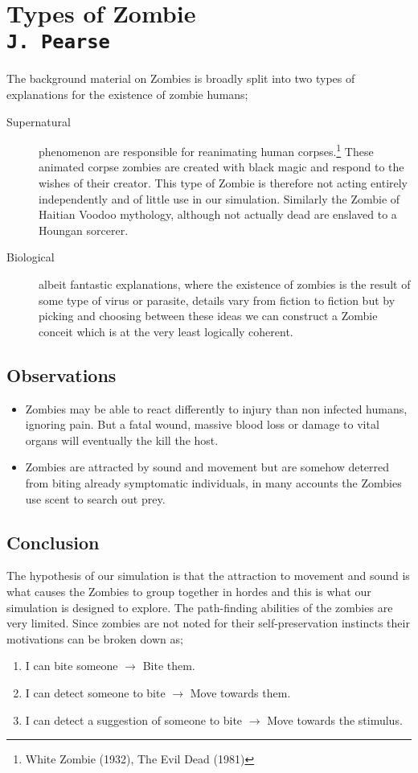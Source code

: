 \pagestyle{empty}

\section{Types of Zombie\\{\small\tt{J.~Pearse}}}
The background material on Zombies is broadly split into two types of explanations for the existence of zombie humans;
\begin{description}
\item[Supernatural] phenomenon are responsible for reanimating human corpses.\footnote{White Zombie (1932), The Evil Dead (1981)} These animated corpse zombies are created with black magic and respond to the wishes of their creator. This type of Zombie is therefore not acting entirely independently and of little use in our simulation. Similarly the Zombie of Haitian Voodoo mythology, although not actually dead are enslaved to a Houngan sorcerer.
\item[Biological] albeit fantastic explanations, where the existence of zombies is the result of some type of virus or parasite, details vary from fiction to fiction but by picking and choosing between these ideas we can construct a Zombie conceit which is at the very least logically coherent.
\end{description}
\subsection{Observations}
\begin{itemize}
\item Zombies may be able to react differently to injury than non infected humans, ignoring pain. But a fatal wound, massive blood loss or damage to vital organs will eventually the kill the host.
\item
Zombies are attracted by sound and movement but are somehow deterred from biting already symptomatic individuals, in many accounts the Zombies use scent to search out prey.
\end{itemize}

\subsection{Conclusion}
The hypothesis of our simulation is that the attraction to movement and sound is what causes the Zombies to group together in hordes and this is what our simulation is designed to explore. The path-finding abilities of the zombies are very limited.
Since zombies are not noted for their self-preservation instincts their motivations can be broken down as;
\begin{enumerate}
\item I can bite someone $\rightarrow$ Bite them.
\item I can detect someone to bite $\rightarrow$ Move towards them.
\item I can detect a suggestion of someone to bite $\rightarrow$ Move towards the stimulus.
\end{enumerate}
\clearpage
\endinput
